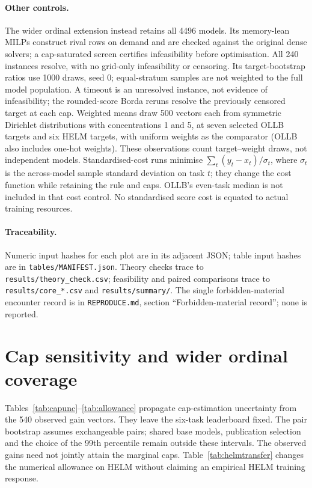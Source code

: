 \documentclass{article}
\begin{document}
\paragraph{Other controls.} The wider ordinal extension instead retains all 4496 models. Its memory-lean MILPs construct rival rows on demand and are checked against the original dense solvers; a cap-saturated screen certifies infeasibility before optimisation. All 240 instances resolve, with no grid-only infeasibility or censoring. Its target-bootstrap ratios use 1000 draws, seed 0; equal-stratum samples are not weighted to the full model population. A timeout is an unresolved instance, not evidence of infeasibility; the rounded-score Borda reruns resolve the previously censored target at each cap. Weighted means draw 500 vectors each from symmetric Dirichlet distributions with concentrations 1 and 5, at seven selected OLLB targets and six HELM targets, with uniform weights as the comparator (OLLB also includes one-hot weights). These observations count target--weight draws, not independent models. Standardised-cost runs minimise $\sum_t(y_t-x_t)/\sigma_t$, where $\sigma_t$ is the across-model sample standard deviation on task $t$; they change the cost function while retaining the rule and caps. OLLB's even-task median is not included in that cost control. No standardised score cost is equated to actual training resources.

\paragraph{Traceability.} Numeric input hashes for each plot are in its adjacent JSON; table input hashes are in \texttt{tables/MANIFEST.json}. Theory checks trace to \texttt{results/theory\_check.csv}; feasibility and paired comparisons trace to \texttt{results/core\_*.csv} and \texttt{results/summary/}. The single forbidden-material encounter record is in \texttt{REPRODUCE.md}, section ``Forbidden-material record''; none is reported.

\section{Cap sensitivity and wider ordinal coverage}
\label{app:capevidence}
Tables~\ref{tab:capunc}--\ref{tab:allowance} propagate cap-estimation uncertainty from the 540 observed gain vectors. They leave the six-task leaderboard fixed. The pair bootstrap assumes exchangeable pairs; shared base models, publication selection and the choice of the 99th percentile remain outside these intervals. The observed gains need not jointly attain the marginal caps. Table~\ref{tab:helmtransfer} changes the numerical allowance on HELM without claiming an empirical HELM training response.
\end{document}
